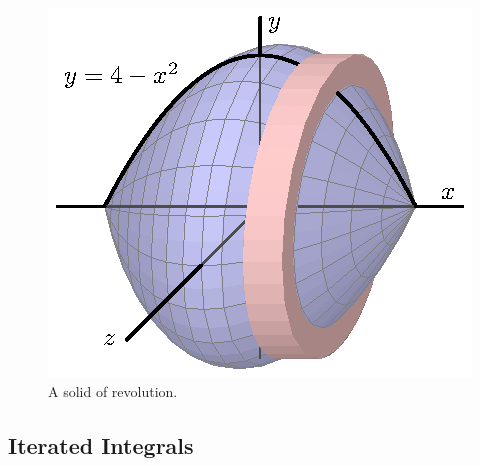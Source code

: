 \begin{figure}[h]
\begin{center}
  \includegraphics{figures/fig_11_2_volume_revolve.eps}
\caption{A solid of revolution.} \label{F:6.2.Ex1}
\end{center}
\end{figure}






\subsection*{Iterated Integrals}

